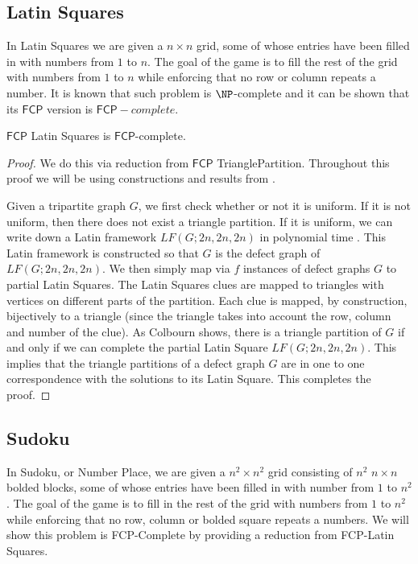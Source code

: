 \documentclass[runningheads,a4paper]{llncs}
\begin{document}
\subsection{Latin Squares}

In Latin Squares we are given a $n \times n$ grid, some of whose entries have been filled in with numbers from $1$ to $n$. The goal of the game is to fill the rest of the grid with numbers from $1$ to $n$ while enforcing that no row or column repeats a number. It is known that such problem is $\NP$-complete and it can be shown that its $\mathsf{FCP}$ version is $\mathsf{FCP}-complete$. 

\begin{theorem}
$\mathsf{FCP}$ Latin Squares is $\mathsf{FCP}$-complete.
\end{theorem}

\begin{proof}
We do this via reduction from $\mathsf{FCP}$ TrianglePartition. Throughout this proof we will be using constructions and results from  \cite{colbourn1984complexity}.

Given a tripartite graph $G$, we first check whether or not it is uniform. If it is not uniform, then there does not exist a triangle partition. If it is uniform, we can write down a Latin framework $LF(G;2n,2n,2n)$ in polynomial time  \cite{colbourn1984complexity}. This Latin framework is constructed so that $G$ is the defect graph of $LF(G;2n,2n,2n)$. We then simply map via $f$ instances of defect graphs $G$ to partial Latin Squares. The Latin Squares clues are mapped to triangles with vertices on different parts of the partition. Each clue is mapped, by construction, bijectively to a triangle (since the triangle takes into account the row, column and number of the clue). As Colbourn shows, there is a triangle partition of $G$ if and only if we can complete the partial Latin Square $LF(G;2n,2n,2n)$. This implies that the triangle partitions of a defect graph $G$ are in one to one correspondence with the solutions to its Latin Square. This completes the proof. 

\end{proof}

\subsection{Sudoku}

In Sudoku, or Number Place, we are given a $n^2 \times n^2$ grid consisting of $n^2$ $n \times n$ bolded blocks, some of whose entries have been filled in with number from $1$ to $n^2$. The goal of the game is to fill in the rest of the grid with numbers from $1$ to $n^2$ while enforcing that no row, column or bolded square repeats a numbers. We will show this problem is FCP-Complete by providing a reduction from FCP-Latin Squares. 
\end{document}
